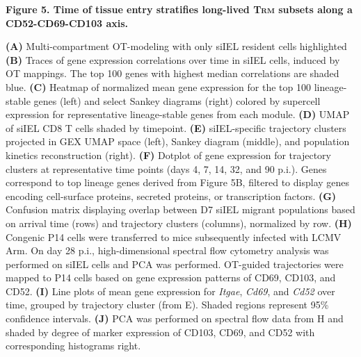 \textbf{Figure 5. Time of tissue entry stratifies long-lived
T\textsc{rm} subsets along a CD52-CD69-CD103 axis.}

\textbf{(A)} Multi-compartment OT-modeling with only siIEL resident
cells highlighted \textbf{(B)} Traces of gene expression correlations
over time in siIEL cells, induced by OT mappings. The top 100 genes with
highest median correlations are shaded blue. \textbf{(C)} Heatmap of
normalized mean gene expression for the top 100 lineage-stable genes
(left) and select Sankey diagrams (right) colored by supercell
expression for representative lineage-stable genes from each module.
\textbf{(D)} UMAP of siIEL CD8 T cells shaded by timepoint. \textbf{(E)}
siIEL-specific trajectory clusters projected in GEX UMAP space (left),
Sankey diagram (middle), and population kinetics reconstruction (right).
\textbf{(F)} Dotplot of gene expression for trajectory clusters at
representative time points (days 4, 7, 14, 32, and 90 p.i.). Genes
correspond to top lineage genes derived from Figure 5B, filtered to
display genes encoding cell-surface proteins, secreted proteins, or
transcription factors. \textbf{(G)} Confusion matrix displaying overlap
between D7 siIEL migrant populations based on arrival time (rows) and
trajectory clusters (columns), normalized by row. \textbf{(H)} Congenic
P14 cells were transferred to mice subsequently infected with LCMV Arm.
On day 28 p.i., high-dimensional spectral flow cytometry analysis was
performed on siIEL cells and PCA was performed. OT-guided trajectories
were mapped to P14 cells based on gene expression patterns of CD69,
CD103, and CD52. \textbf{(I)} Line plots of mean gene expression for
\emph{Itgae}, \emph{Cd69}, and \emph{Cd52} over time, grouped by
trajectory cluster (from E). Shaded regions represent 95\% confidence
intervals. \textbf{(J)} PCA was performed on spectral flow data from H
and shaded by degree of marker expression of CD103, CD69, and CD52 with
corresponding histograms right.



